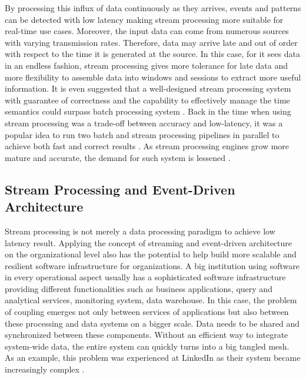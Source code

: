 By processing this influx of data continuously as they arrives, events and patterns can be detected with low latency making stream processing more suitable for real-time use cases. Moreover, the input data can come from numerous sources with varying transmission rates. Therefore, data may arrive late and out of order with respect to the time it is generated at the source. In this case, for it sees data in an endless fashion, stream processing gives more tolerance for late data and more flexibility to assemble data into windows and sessions to extract more useful information. It is even suggested that a well-designed stream processing system with guarantee of correctness and the capability to effectively manage the time semantics could surpass batch processing system \cite{stream101}. Back in the time when using stream processing was a trade-off between accuracy and low-latency, it was a popular idea to run two batch and stream processing pipelines in parallel to achieve both fast and correct results \cite{lambdaarchitecture}.  As stream processing engines grow more mature and accurate, the demand for such system is lessened \cite{questionlambdaarchitecture}.
\subsection{Stream Processing and Event-Driven Architecture}

Stream processing is not merely a data processing paradigm to achieve low latency result. Applying the concept of streaming and event-driven architecture on the organizational level also has the potential to help build more scalable and resilient software infrastructure for organizations. A big institution using software in every operational aspect usually has a sophisticated software infrastructure providing different functionalities such as business applications, query and analytical services, monitoring system, data warehouse. In this case, the problem of coupling emerges not only between services of applications but also between these processing and data systems on a bigger scale. Data needs to be shared and synchronized between these components. Without an efficient way to integrate system-wide data, the entire system can quickly turns into a big tangled mesh. As an example, this problem was experienced at LinkedIn as their system became increasingly complex \cite{eventstreamingplatform}. 


